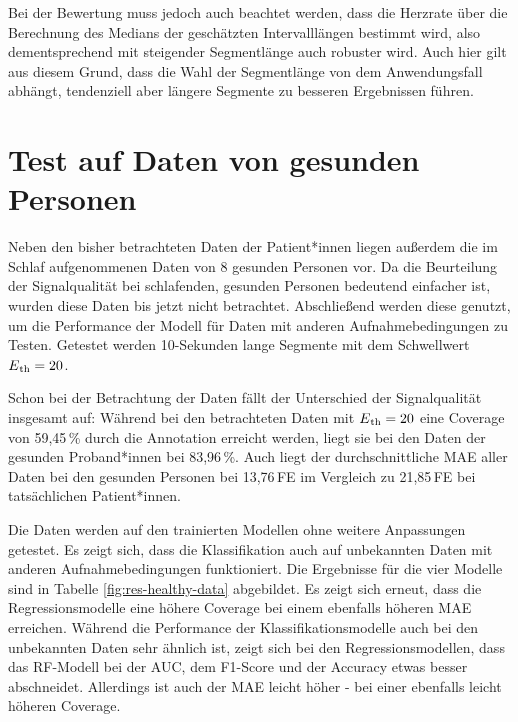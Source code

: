  Bei der Bewertung muss jedoch auch beachtet werden, dass die Herzrate über die Berechnung des Medians der geschätzten Intervalllängen bestimmt wird, also dementsprechend mit steigender Segmentlänge auch robuster wird. Auch hier gilt aus diesem Grund, dass die Wahl der Segmentlänge von dem Anwendungsfall abhängt, tendenziell aber längere Segmente zu besseren Ergebnissen führen.

\section{Test auf Daten von gesunden Personen}

Neben den bisher betrachteten Daten der Patient*innen liegen außerdem die im Schlaf aufgenommenen Daten von 8 gesunden Personen vor. Da die Beurteilung der Signalqualität bei schlafenden, gesunden Personen bedeutend einfacher ist, wurden diese Daten bis jetzt nicht betrachtet. Abschließend werden diese genutzt, um die Performance der Modell für Daten mit anderen Aufnahmebedingungen zu Testen. Getestet werden 10-Sekunden lange Segmente mit dem Schwellwert $E\textsubscript{th} = 20$.

Schon bei der Betrachtung der Daten fällt der Unterschied der Signalqualität insgesamt auf: Während bei den betrachteten Daten mit $E\textsubscript{th} = 20$ eine Coverage von 59,45\,\% durch die Annotation erreicht werden, liegt sie bei den Daten der gesunden Proband*innen bei 83,96\,\%. Auch liegt der durchschnittliche \ac{MAE} aller Daten bei den gesunden Personen bei 13,76\,\si{FE} im Vergleich zu 21,85\,\si{FE} bei tatsächlichen Patient*innen.

Die Daten werden auf den trainierten Modellen ohne weitere Anpassungen getestet. Es zeigt sich, dass die Klassifikation auch auf unbekannten Daten mit anderen Aufnahmebedingungen funktioniert. Die Ergebnisse für die vier Modelle sind in Tabelle \ref{fig:res-healthy-data} abgebildet. Es zeigt sich erneut, dass die Regressionsmodelle eine höhere Coverage bei einem ebenfalls höheren \ac{MAE} erreichen. Während die Performance der Klassifikationsmodelle auch bei den unbekannten Daten sehr ähnlich ist, zeigt sich bei den Regressionsmodellen, dass das \ac{RF}-Modell bei der \ac{AUC}, dem F1-Score und der Accuracy etwas besser abschneidet. Allerdings ist auch der \ac{MAE} leicht höher - bei einer ebenfalls leicht höheren Coverage.

